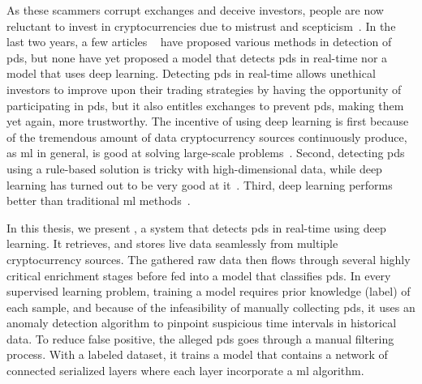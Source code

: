 As these scammers corrupt exchanges and deceive investors, people are now reluctant to invest in cryptocurrencies due to mistrust and scepticism~\cite{anchor}. In the last two years, a few articles ~\cite{P&D_to_the_moon, P&D_anatomy, P&D_scheme, P&D_pumping} have proposed various methods in detection of \acp{pd}, but none have yet proposed a model that detects \acp{pd} in real-time nor a model that uses deep learning. Detecting \acp{pd} in real-time allows unethical investors to improve upon their trading strategies by having the opportunity of participating in \acp{pd}, but it also entitles exchanges to prevent \acp{pd}, making them yet again, more trustworthy. The incentive of using deep learning is first because of the tremendous amount of data cryptocurrency sources continuously produce, as \ac{ml} in general, is good at solving large-scale problems~\cite{aws}. Second, detecting \acp{pd} using a rule-based solution is tricky with high-dimensional data, while deep learning has turned out to be very good at it~\cite{lecun2015deep}. Third, deep learning performs better than traditional \ac{ml} methods~\cite{dl_intrusion, peng2015multi}. 

In this thesis, we present \project, a system that detects \acp{pd} in real-time using deep learning. It retrieves, and stores live data seamlessly from multiple cryptocurrency sources. The gathered raw data then flows through several highly critical enrichment stages before fed into a model that classifies \acp{pd}. In every supervised learning problem, training a model requires prior knowledge (label) of each sample, and because of the infeasibility of manually collecting \acp{pd}, it uses an anomaly detection algorithm to pinpoint suspicious time intervals in historical data. To reduce false positive, the alleged \acp{pd} goes through a manual filtering process. With a labeled dataset, it trains a model that contains a network of connected serialized layers where each layer incorporate a \ac{ml} algorithm.


